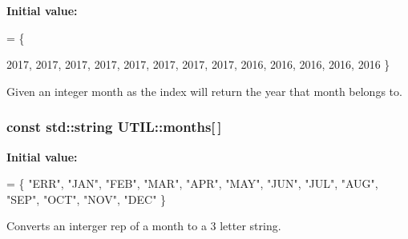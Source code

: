 {\bfseries Initial value\-:}
\begin{DoxyCode}
= \{

    2017, 2017, 2017, 2017, 2017, 2017, 2017, 2017, 2016, 2016, 2016, 2016, 2016
\}
\end{DoxyCode}
Given an integer month as the index will return the year that month belongs to. \hypertarget{group__UTIL_ga88a2cb2e6ccec0c5df742e71dc28835b}{
\subsubsection[{months}]{\setlength{\rightskip}{0pt plus 5cm}const std\-::string U\-T\-I\-L\-::months\mbox{[}$\,$\mbox{]}}}\label{group__UTIL_ga88a2cb2e6ccec0c5df742e71dc28835b}
{\bfseries Initial value\-:}
\begin{DoxyCode}
= \{
    \textcolor{stringliteral}{"ERR"}, \textcolor{stringliteral}{"JAN"}, \textcolor{stringliteral}{"FEB"}, \textcolor{stringliteral}{"MAR"}, \textcolor{stringliteral}{"APR"}, \textcolor{stringliteral}{"MAY"}, \textcolor{stringliteral}{"JUN"}, \textcolor{stringliteral}{"JUL"}, \textcolor{stringliteral}{"AUG"}, \textcolor{stringliteral}{"SEP"}, \textcolor{stringliteral}{"OCT"}, \textcolor{stringliteral}{"NOV"}, \textcolor{stringliteral}{"DEC"}
\}
\end{DoxyCode}
Converts an interger rep of a month to a 3 letter string. 